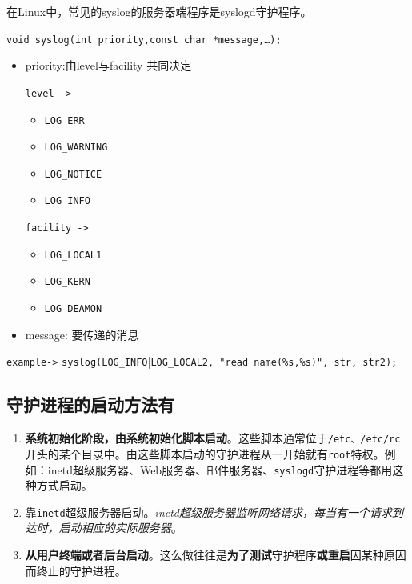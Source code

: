 \documentclass[UTF8,a4paper,12pt]{ctexbook}
\begin{document}
			在Linux中，常见的syslog的服务器端程序是syslogd守护程序。
			
			\verb|void syslog(int priority,const char *message,…);|
			\begin{itemize}
				\item priority:由level与facility 共同决定
				
					\verb|level ->|
					\begin{itemize}
						\item \verb|LOG_ERR|
						\item \verb|LOG_WARNING|
						\item \verb|LOG_NOTICE|
						\item \verb|LOG_INFO|
					\end{itemize}
					
					\verb|facility ->|
					\begin{itemize}
						\item \verb|LOG_LOCAL1|
						\item \verb|LOG_KERN|
						\item \verb|LOG_DEAMON|
					\end{itemize}
				\item message: 要传递的消息
			\end{itemize}
			
			\verb|example->|
				\verb|syslog(LOG_INFO||\verb|LOG_LOCAL2, "read name(%s,%s)", str, str2);|
		\subsection{守护进程的启动方法有}
			\begin{enumerate}
				\item \textbf{系统初始化阶段，由系统初始化脚本启动}。这些脚本通常位于\verb|/etc、/etc/rc|开头的某个目录中。由这些脚本启动的守护进程从一开始就有\verb|root|特权。例如：inetd超级服务器、Web服务器、邮件服务器、\verb|syslogd|守护进程等都用这种方式启动。
				\item 靠\verb|inetd|超级服务器启动。\textit{inetd超级服务器监听网络请求，每当有一个请求到达时，启动相应的实际服务器}。
				\item \textbf{从用户终端或者后台启动}。这么做往往是\textbf{为了测试}守护程序\textbf{或重启}因某种原因而终止的守护进程。
			\end{enumerate}
		
\end{document}
